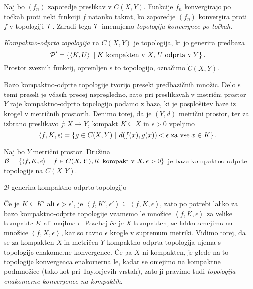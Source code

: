 \begin{trditev}
    Naj bo \((f_n)\) zaporedje preslikav v \(C(X, Y)\). Funkcije \(f_n\) konvergirajo po točkah proti neki funkciji $f$ natanko takrat, ko zaporedje \((f_n)\) konvergira proti $f$ v topologiji $\mathcal{T}$. Zaradi tega \(\mathcal{T}\) imenujemo \emph{topologija konvergnce po točkah}.
\end{trditev}

\begin{definicija}
    \emph{Kompaktno-odprta topologija} na $C(X,Y)$ je topologija, ki jo generira predbaza \[\mathcal{P'} = \left\{\left\langle K, U \right\rangle \ | \ K \text{ kompakten v } X, \, U \text{ odprta v } Y\right\}.\]
    Prostor zveznih funkcij, opremljen s to topologijo, označimo $\widehat{C}(X,Y)$. 
\end{definicija}

Bazo kompaktno-odprte topologije tvorijo preseki predbazičnih množic. Delo s temi preseli je včasih precej nepregledno, zato pri preslikavah v metrični prostor $Y$ raje kompaktno-odprto topologijo podamo z bazo, ki je posplošitev baze iz krogel v metričnih prostorih. Denimo torej, da je $(Y, d)$ metrični prostor, ter za izbrano preslikavo $f: X \to Y$, kompakt \(K \subseteq X\) in $\epsilon > 0$ vpeljimo  
$$\left\langle f, K, \epsilon \right\rangle = \left\{g \in C(X, Y) \ | \ d(f(x), g(x)) < \epsilon \text{ za vse } x \in K\right\}.$$

\begin{trditev}
    Naj bo $Y$ metrični prostor. Družina $\mathcal{B} = \left\{\left\langle f, K, \epsilon \right\rangle \ | \ f \in C(X, Y), K \text{ kompakt v } X, \epsilon>0\right\}$ je baza kompaktno odprte topologije na $C(X, Y)$.
\end{trditev}

\begin{opomba}
    \(\mathcal{B}\) generira kompaktno-odprto topologijo.
\end{opomba}

Če je $K \subseteq K'$ ali $\epsilon > \epsilon'$, je $\left\langle f, K', \epsilon' \right\rangle \subseteq \left\langle f, K, \epsilon \right\rangle$, zato po potrebi lahko za bazo kompaktno-odprte topologije vzamemo le množice \(\left\langle f, K, \epsilon \right\rangle\) za velike kompakte $K$ ali majhne $\epsilon$. Posebej če je $X$ kompakten, se lahko omejimo na množice \(\left\langle f, X, \epsilon \right\rangle\), kar so ravno $\epsilon$ krogle v supremum metriki. Vidimo torej, da se za kompakten $X$ in metričen $Y$ kompaktno-odprta topologija ujema s topologijo enakomerne konvergence. Če pa $X$ ni kompakten, je glede na to topologijo konvergenca enakomerna le, kadar se omejimo na kompaktne podmnožice (tako kot pri Taylorjevih vrstah), zato ji pravimo tudi \emph{topologija enakomerne konvergence na kompaktih}.

